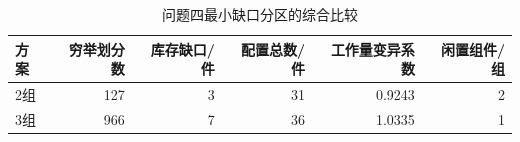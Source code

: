\begin{table}[H]\centering\scriptsize
\caption{问题四最小缺口分区的综合比较}\label{tab:q4_compare}
\begin{tabular}{lrrrrr}
\toprule
方案 & 穷举划分数 & 库存缺口/件 & 配置总数/件 & 工作量变异系数 & 闲置组件/组\\\midrule
2组 & 127 & 3 & 31 & 0.9243 & 2\\
3组 & 966 & 7 & 36 & 1.0335 & 1\\
\bottomrule\end{tabular}
\end{table}
